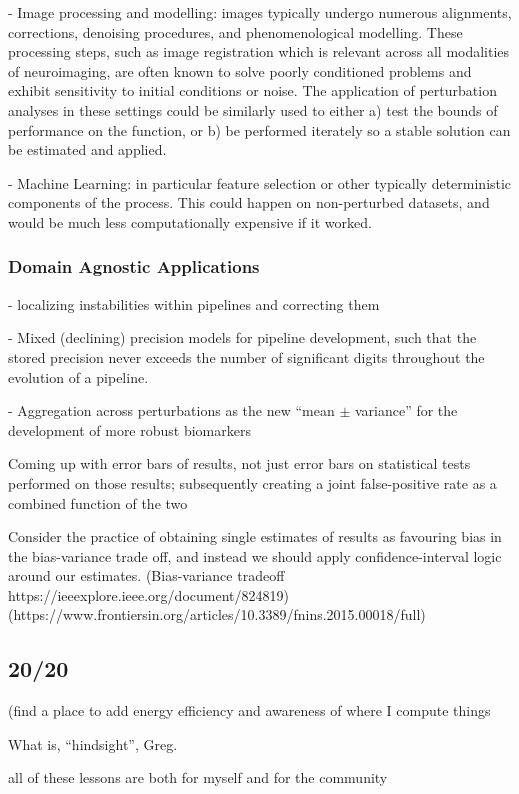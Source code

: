 - Image processing and modelling: images typically undergo numerous alignments, corrections, denoising procedures,
and phenomenological modelling. These processing steps, such as image registration which is relevant across all
modalities of neuroimaging, are often known to solve poorly conditioned problems and exhibit sensitivity to initial
conditions or noise. The application of perturbation analyses in these settings could be similarly used to either a)
test the bounds of performance on the function, or b) be performed iterately so a stable solution can be estimated
and applied.

- Machine Learning: in particular feature selection or other typically deterministic components of the process. This
could happen on non-perturbed datasets, and would be much less computationally expensive if it worked.

\subsubsection{Domain Agnostic Applications}
- localizing instabilities within pipelines and correcting them

- Mixed (declining) precision models for pipeline development, such that the stored precision never exceeds the number of
significant digits throughout the evolution of a pipeline.

- Aggregation across perturbations as the new ``mean $\pm$ variance'' for the development of more robust biomarkers

Coming up with error bars of results, not just error bars on statistical tests performed on those results; subsequently
creating a joint false-positive rate as a combined function of the two

Consider the practice of obtaining single estimates of results as favouring bias in the bias-variance trade off, and
instead we should apply confidence-interval logic around our estimates.
(Bias-variance tradeoff https://ieeexplore.ieee.org/document/824819)
(https://www.frontiersin.org/articles/10.3389/fnins.2015.00018/full)

\subsection{20/20}
(find a place to add energy efficiency and awareness of where I compute things 

What is, ``hindsight'', Greg. 

all of these lessons are both for myself and for the community


